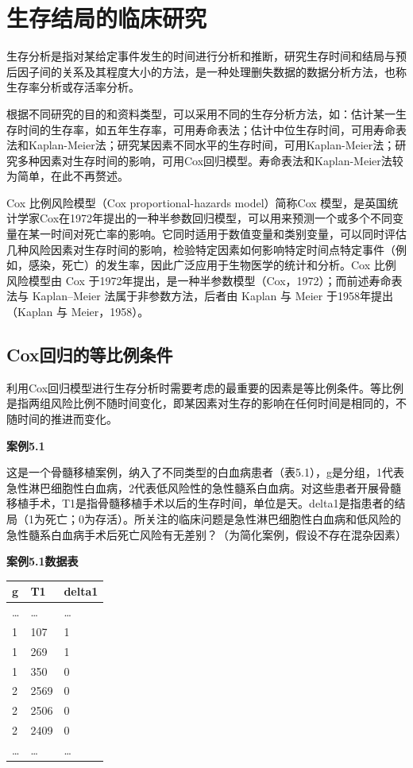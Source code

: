 \documentclass[
  chinese-hans,
  letterpaper,
  DIV=11,
  numbers=noendperiod]{scrreprt}
\newcounter{none} %
\begin{document}

\chapter{生存结局的临床研究}\label{ux751fux5b58ux7ed3ux5c40ux7684ux4e34ux5e8aux7814ux7a76}

生存分析是指对某给定事件发生的时间进行分析和推断，研究生存时间和结局与预后因子间的关系及其程度大小的方法，是一种处理删失数据的数据分析方法，也称生存率分析或存活率分析。

根据不同研究的目的和资料类型，可以采用不同的生存分析方法，如：估计某一生存时间的生存率，如五年生存率，可用寿命表法；估计中位生存时间，可用寿命表法和Kaplan-Meier法；研究某因素不同水平的生存时间，可用Kaplan-Meier法；研究多种因素对生存时间的影响，可用Cox回归模型。寿命表法和Kaplan-Meier法较为简单，在此不再赘述。

Cox 比例风险模型（Cox proportional-hazards model）简称Cox
模型，是英国统计学家Cox在1972年提出的一种半参数回归模型，可以用来预测一个或多个不同变量在某一时间对死亡率的影响。它同时适用于数值变量和类别变量，可以同时评估几种风险因素对生存时间的影响，检验特定因素如何影响特定时间点特定事件（例如，感染，死亡）的发生率，因此广泛应用于生物医学的统计和分析。Cox
比例风险模型由 Cox
于1972年提出，是一种半参数模型（Cox，1972）；而前述寿命表法与
Kaplan--Meier 法属于非参数方法，后者由 Kaplan 与 Meier
于1958年提出（Kaplan 与 Meier，1958）。

\section{Cox回归的等比例条件}\label{coxux56deux5f52ux7684ux7b49ux6bd4ux4f8bux6761ux4ef6}

利用Cox回归模型进行生存分析时需要考虑的最重要的因素是等比例条件。等比例是指两组风险比例不随时间变化，即某因素对生存的影响在任何时间是相同的，不随时间的推进而变化。

\textbf{案例5.1}

这是一个骨髓移植案例，纳入了不同类型的白血病患者（表5.1），g是分组，1代表急性淋巴细胞性白血病，2代表低风险性的急性髓系白血病。对这些患者开展骨髓移植手术，T1是指骨髓移植手术以后的生存时间，单位是天。delta1是指患者的结局（1为死亡；0为存活）。所关注的临床问题是急性淋巴细胞性白血病和低风险的急性髓系白血病手术后死亡风险有无差别？（为简化案例，假设不存在混杂因素）

\textbf{案例5.1数据表}

{\def\LTcaptype{none} %
\begin{longtable}[]{@{}lll@{}}
\toprule\noalign{}
g & T1 & delta1 \\
\midrule\noalign{}
\endhead
\bottomrule\noalign{}
\endlastfoot
\ldots{} & \ldots{} & \ldots{} \\
1 & 107 & 1 \\
1 & 269 & 1 \\
1 & 350 & 0 \\
2 & 2569 & 0 \\
2 & 2506 & 0 \\
2 & 2409 & 0 \\
\ldots{} & \ldots{} & \ldots{} \\
\end{longtable}
}
\end{document}
